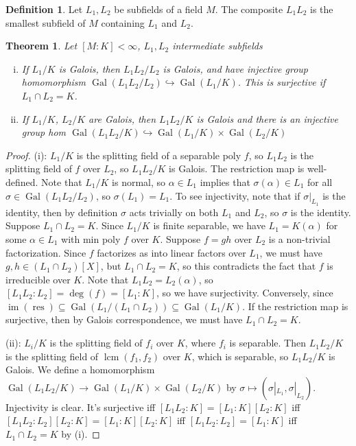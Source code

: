 \documentclass{article}
\theoremstyle{definition}
\newtheorem*{defn*}{Definition}
\theoremstyle{remark}
\theoremstyle{plain}
\newtheorem{thm}[defn]{Theorem}
\newcommand{\Gal}{\operatorname{Gal}}
\begin{document}
\begin{defn*}
    Let $L_1,L_2$ be subfields of a field $M$. The composite $L_1L_2$ is the smallest subfield of $M$ containing $L_1$ and $L_2$.
\end{defn*}
\begin{thm}
    Let $[M:K]<\infty$, $L_1,L_2$ intermediate subfields
    \begin{enumerate}[(i)]
        \item If $L_1/K$ is Galois, then $L_1L_2/L_2$ is Galois, and have injective group homomorphism $\Gal(L_1L_2/L_2)\hookrightarrow \Gal(L_1/K)$. This is surjective if $L_1\cap L_2=K$.
        \item If $L_1/K$, $L_2/K$ are Galois, then $L_1L_2/K$ is Galois and there is an injective group hom $\Gal(L_1L_2/K)\hookrightarrow \Gal(L_1/K)\times \Gal(L_2/K)$
    \end{enumerate}
\end{thm}
\begin{proof}
    (i): $L_1/K$ is the splitting field of a separable poly $f$, so $L_1L_2$ is the splitting field of $f$ over $L_2$, so $L_1L_2/K$ is Galois. The restriction map is well-defined. Note that $L_1/K$ is normal, so $\alpha\in L_1$ implies that $\sigma(\alpha)\in L_1$ for all $\sigma\in\Gal(L_1L_2/L_2)$, so $\sigma(L_1) =L_1$. To see injectivity, note that if $\sigma|_{L_1}$ is the identity, then by definition $\sigma$ acts trivially on both $L_1$ and $L_2$, so $\sigma$ is the identity. Suppose $L_1\cap L_2=K$. Since $L_1/K$ is finite separable, we have $L_1=K(\alpha)$ for some $\alpha\in L_1$ with min poly $f$ over $K$. Suppose $f=gh$ over $L_2$ is a non-trivial factorization. Since $f$ factorizes as into linear factors over $L_1$, we must have $g,h\in (L_1\cap L_2)[X]$, but $L_1\cap L_2=K$, so this contradicts the fact that $f$ is irreducible over $K$. Note that $L_1L_2=L_2(\alpha)$, so $[L_1L_2:L_2]=\deg (f)=[L_1:K]$, so we have surjectivity. Conversely, since $\operatorname{im}(\operatorname{res})\subseteq\Gal(L_1/(L_1\cap L_2))\subseteq\Gal(L_1/K)$. If the restriction map is surjective, then by Galois correspondence, we must have $L_1\cap L_2=K$.

    (ii): $L_i/K$ is the splitting field of $f_i$ over $K$, where $f_i$ is separable. Then $L_1L_2/K$ is the splitting field of $\operatorname{lcm}(f_1,f_2)$ over $K$, which is separable, so $L_1L_2/K$ is Galois. We define a homomorphism $\Gal(L_1L_2/K)\to \Gal(L_1/K)\times \Gal(L_2/K)$ by $\sigma\mapsto (\sigma|_{L_1},\sigma|_{L_2})$. Injectivity is clear. It's surjective iff $[L_1L_2:K]=[L_1:K][L_2:K]$ iff $[L_1L_2:L_2][L_2:K]=[L_1:K][L_2:K]$ iff $[L_1L_2:L_2]=[L_1:K]$ iff $L_1\cap L_2=K$ by (i).
\end{proof}
\end{document}
